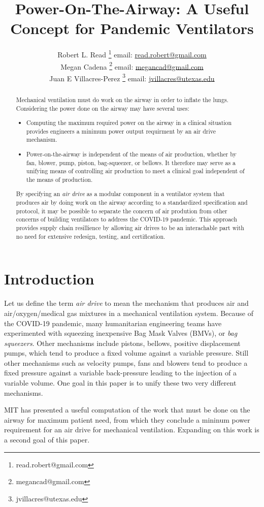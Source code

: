 \documentclass{article}
\title{Power-On-The-Airway: A Useful Concept for Pandemic Ventilators}
\author{Robert L. Read
  \thanks{read.robert@gmail.com}
  email: \href{mailto:read.robert@gmail.com}{read.robert@gmail.com}\\
Megan Cadena
  \thanks{megancad@gmail.com}
  email: \href{mailto:megancad@gmail.com}{megancad@gmail.com}\\
  Juan E Villacres-Perez
  \thanks{jvillacres@utexas.edu}
  email: \href{mailto:jvillacres@utexas.edu}{jvillacres@utexas.edu}
  }
\begin{document}
\maketitle
\begin{abstract}
  Mechanical ventilation must do work on the airway in order to inflate the lungs.
  Considering the power done on the airway may have several uses:
  \begin{itemize}
  \item Computing the maximum required power on the airway in
    a clinical situation provides engineers a minimum power output requirment
    by an air drive mechanism.
  \item Power-on-the-airway is independent of the means of air production,
    whether by fan, blower, pump, piston, bag-squeezer, or bellows. It therefore
    may serve as a unifying means of controlling air production to meet
    a clinical goal independent of the means of production.
  \end{itemize}
  By specifying an {\em air drive} as a modular component in a ventilator
  system that produces air by doing work on the airway according to a
  standardized specification and protocol, it may be possible to
  separate the concern of air prodution from other concerns of building
  ventilators to address the COVID-19 pandemic. This approach provides
  supply chain resillience by allowing air drives to be an interachable part with
  no need for extensive redesign, testing, and certification.
\end{abstract}


\section{Introduction}

Let us define the term {\em air drive} to mean the mechanism that
produces air and air/oxygen/medical gas mixtures in a mechanical
ventilation system. Because of the
COVID-19 pandemic, many humanitarian engineering teams have
experimented with squeezing inexpensive Bag Mask Valves (BMVs), or
{\em bag squeezers}.
Other mechanisms include pistons, bellows,
positive displacement pumps, which tend to produce a fixed volume against
a variable pressure.
Still other mechanisms such as velocity pumps,
fans and blowers tend to produce a fixed
pressure against a variable back-pressure leading to the injection
of a variable volume. One goal in this paper is to unify these
two very different mechanisms.

MIT has presented a useful computation of the work that must be done
on the airway for maximum patient need, from which they conclude a
mininum power requirement for an air drive for
mechanical ventilation\cite{mitpowercalculation}. Expanding on
this work is a second goal of this paper.
\end{document}
